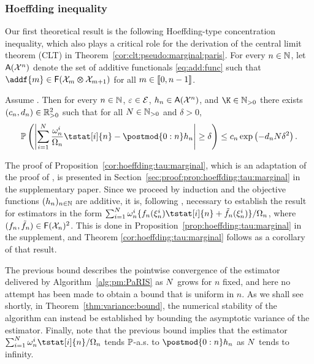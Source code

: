 
\subsubsection*{Hoeffding inequality}

Our first theoretical result is the following Hoeffding-type concentration inequality, which also plays a critical role for the derivation of the central limit theorem (CLT) in Theorem~\ref{cor:clt:pseudo:marginal:paris}. For every $n \in \mathbb{N}$, let $\mathsf{A}(\mathcal{X}^n)$ denote the set of additive functionals \eqref{eq:add:func} such that $\addf{m} \in \bmf{\Xfd_m \tensprod \Xfd_{m + 1}}$ for all $m \in \llbracket 0, n - 1 \rrbracket$.   
\begin{theorem}
\label{cor:hoeffding:tau:marginal}
Assume . Then for every $n \in \mathbb{N}$, $\varepsilon \in \mathcal{E}$, $h_n \in \mathsf{A}(\mathcal{X}^n)$, and $\K \in \nsetpos$ there exists $(c_n, d_n) \in \mathbb{R}_{> 0}^2$ such that for all $N \in \mathbb{N}_{> 0}$ and $\delta > 0$,
$$
\pP\left(\left| \sum_{i = 1}^\N \frac{\ewght{n}{i}}{\sumwght{n}} \tstat[i]{n} - \postmod{0:n} h_n \right| \geq \delta \right) \leq c_n \exp \left( - d_n \N \delta^2 \right).
$$
\end{theorem}

The proof of Proposition~\ref{cor:hoeffding:tau:marginal}, which is an adaptation of the proof of \cite[Theorem~1]{olsson:westerborn:2014b}, is presented in Section~\ref{sec:proof:prop:hoeffding:tau:marginal} in the supplementary paper. Since we proceed by induction and the objective functions $(h_n)_{n \in \mathbb{N}}$ are additive, it is, following \cite{olsson:westerborn:2014b}, necessary to establish the result for estimators in the form $\sum_{i = 1}^\N \ewght{n}{i} \{ f_n(\epart{n}{i}) \tstat[i]{n} + \ftd{n}(\epart{n}{i}) \} / \sumwght{n}$, where $(f_n, \tilde{f}_{n}) \in \mathsf{F}(\mathcal{X}_n)^2$. This is done in Proposition~\ref{prop:hoeffding:tau:marginal} in the supplement, and Theorem \ref{cor:hoeffding:tau:marginal} follows as a corollary of that result. 

The previous bound describes the pointwise convergence of the estimator delivered by Algorithm~\ref{alg:pm:PaRIS} as $N$ grows for $n$ fixed, and here no attempt has been made to obtain a bound that is uniform in $n$. As we shall see shortly, in Theorem~\ref{thm:variance:bound}, the numerical stability of the algorithm can instead be established by bounding the asymptotic variance of the estimator. Finally, note that the previous bound implies that the estimator $\sum_{i = 1}^\N \ewght{n}{i} \tstat[i]{n} / \sumwght{n}$ tends $\mathbb{P}$-a.s. to $\postmod{0:n} h_n$ as $N$ tends to infinity. 

